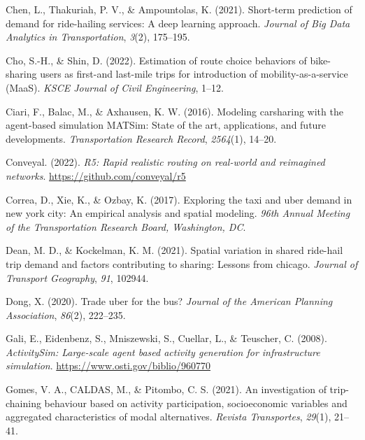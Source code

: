 \documentclass[fancy, masters]{byuthesis}
\newlength{\cslhangindent}
\newlength{\cslentryspacingunit} %
\newenvironment{CSLReferences}[2] %
 {%
  \setlength{\parindent}{0pt}
  \ifodd #1
  \let\oldpar\par
  \def\par{\hangindent=\cslhangindent\oldpar}
  \fi
  \setlength{\parskip}{#2\cslentryspacingunit}
 }%
 {}
\begin{document}
\begin{CSLReferences}{1}{0}
\leavevmode{}%
Chen, L., Thakuriah, P. V., \& Ampountolas, K. (2021). Short-term prediction of demand for ride-hailing services: A deep learning approach. \emph{Journal of Big Data Analytics in Transportation}, \emph{3}(2), 175--195.

\leavevmode{}%
Cho, S.-H., \& Shin, D. (2022). Estimation of route choice behaviors of bike-sharing users as first-and last-mile trips for introduction of mobility-as-a-service (MaaS). \emph{KSCE Journal of Civil Engineering}, 1--12.

\leavevmode{}%
Ciari, F., Balac, M., \& Axhausen, K. W. (2016). Modeling carsharing with the agent-based simulation MATSim: State of the art, applications, and future developments. \emph{Transportation Research Record}, \emph{2564}(1), 14--20.

\leavevmode{}%
Conveyal. (2022). \emph{R5: Rapid realistic routing on real-world and reimagined networks}. \url{https://github.com/conveyal/r5}

\leavevmode{}%
Correa, D., Xie, K., \& Ozbay, K. (2017). Exploring the taxi and uber demand in new york city: An empirical analysis and spatial modeling. \emph{96th Annual Meeting of the Transportation Research Board, Washington, DC}.

\leavevmode{}%
Dean, M. D., \& Kockelman, K. M. (2021). Spatial variation in shared ride-hail trip demand and factors contributing to sharing: Lessons from chicago. \emph{Journal of Transport Geography}, \emph{91}, 102944.

\leavevmode{}%
Dong, X. (2020). Trade uber for the bus? \emph{Journal of the American Planning Association}, \emph{86}(2), 222--235.

\leavevmode{}%
Gali, E., Eidenbenz, S., Mniszewski, S., Cuellar, L., \& Teuscher, C. (2008). \emph{ActivitySim: Large-scale agent based activity generation for infrastructure simulation}. \url{https://www.osti.gov/biblio/960770}

\leavevmode{}%
Gomes, V. A., CALDAS, M., \& Pitombo, C. S. (2021). An investigation of trip-chaining behaviour based on activity participation, socioeconomic variables and aggregated characteristics of modal alternatives. \emph{Revista Transportes}, \emph{29}(1), 21--41.


\end{CSLReferences}
\end{document}
